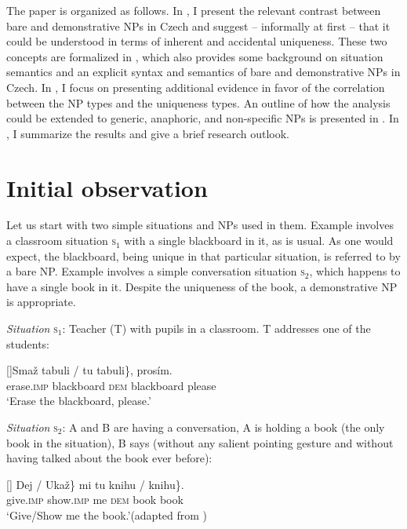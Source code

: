 \documentclass[output=paper,colorlinks,citecolor=brown,newtxmath]{langscibook}
\begin{document}
The paper is organized as follows. In , I present the relevant contrast between bare and demonstrative NPs in Czech and suggest -- informally at first -- that it could be understood in terms of inherent and accidental uniqueness. These two concepts are formalized in , which also provides some background on situation semantics and an explicit syntax and semantics of bare and demonstrative NPs in Czech. In , I focus on presenting additional evidence in favor of the correlation between the NP types and the uniqueness types. An outline of how the analysis could be extended to generic, anaphoric, and non-specific NPs is presented in . In , I summarize the results and give a brief research outlook.

\largerpage[-3] %

\section{Initial observation}\label{simik:sec:observation}

Let us start with two simple situations and NPs used in them. Example  involves a classroom situation \textsc{s}$_1$ with a single blackboard in it, as is usual. As one would expect, the blackboard, being unique in that particular situation, is referred to by a bare NP. Example  involves a simple conversation situation \textsc{s}$_2$, which happens to have a single book in it. Despite the uniqueness of the book, a demonstrative NP is appropriate.

\eanoraggedright \textit{Situation} \textsc{s}$_1$: Teacher (T) with pupils in a classroom. T addresses one of the students:\label{simik:ex:blackboard}
\begin{xlist}
[]{\gll Smaž \minsp{\{} tabuli / \minsp{\#} tu tabuli\}, prosím.\\
erase.\textsc{imp} {} blackboard {} {} \textsc{dem} blackboard please\\
\glt `Erase the blackboard, please.'}
\end{xlist}
\z

\eanoraggedright \textit{Situation} \textsc{s}$_2$: A and B are having a conversation, A is holding a book (the only book in the situation), B says (without any salient pointing gesture and without having talked about the book ever before):\label{simik:ex:kramsky}
\begin{xlist}
[]{\gll \minsp{\{} Dej / Ukaž\} mi \minsp{\{} tu knihu / \minsp{\#} knihu\}.\\
{} give.\textsc{imp} {} show.\textsc{imp} me {} \textsc{dem} book {} {} book\\
\glt `Give/Show me the book.'\hfill (adapted from \citealt[62]{Kramsky1972})}
\end{xlist}
\z
\end{document}
